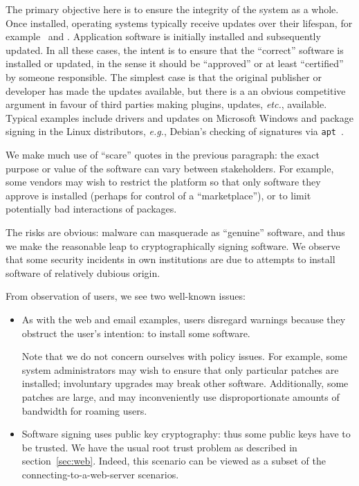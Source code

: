 \documentclass{article}
\def\citeN{\citet}
\def\cite{\citep}
\newcommand{\eg}{\textit{e.g.}}
\newcommand{\etc}{\textit{etc.}}
\newenvironment{userstories}{\begin{description}}{\end{description}}
\begin{document}
\begin{userstories}
\USAsupdate
\end{userstories}

The primary objective here is to ensure the integrity of the system
as a whole.  Once installed, operating systems typically receive
updates over their lifespan, for example~\citeN{mMS1} and \citeN{mDebian1}.  Application software is initially
installed and subsequently updated.  In all these cases, the intent is
to ensure that the “correct” software is installed or updated, in the
sense it should be “approved” or at least “certified” by someone
responsible.  The simplest case is that the original publisher or
developer has made the updates available, but there is a an obvious
competitive argument in favour of third parties making plugins,
updates, \etc, available.
Typical examples include drivers and updates on Microsoft Windows and
package signing in the Linux distributors, \eg, Debian's checking of
signatures via \verb|apt|~\cite{mDebian2}.

We make much use of ``scare'' quotes in the previous paragraph: the
exact purpose or value of the software can vary between stakeholders.
For example, some vendors may wish to restrict the platform so that
only software they approve is installed (perhaps for control of a
“marketplace”), or to limit potentially bad interactions of packages.

The risks are obvious: malware can masquerade as “genuine” software,
and thus we make the reasonable leap to cryptographically signing software.  We
observe that some security incidents in own institutions are due to attempts to
install software of relatively dubious origin.

From observation of users, we see two well-known
issues:
\begin{itemize}
\item As with the web and email examples, users
  disregard warnings because they obstruct the user's intention: to
  install some software.  

  Note that we do not concern ourselves with
  policy issues.  For example, some system administrators may wish to
  ensure that only particular patches are installed; involuntary
  upgrades may break other software.  Additionally, some patches are
  large, and may inconveniently use disproportionate amounts of
  bandwidth for roaming users.
\item Software signing uses public key cryptography: thus some public
  keys have to be trusted.  We have the usual root trust problem as
  described in section~\ref{sec:web}.  Indeed, this scenario can be
  viewed as a subset of the connecting-to-a-web-server scenarios.
\end{itemize}
\end{document}
